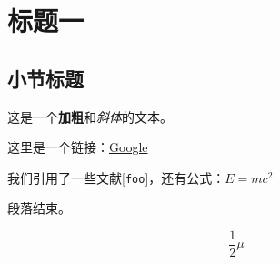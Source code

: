 \chapter{标题一}
\section{小节标题}
这是一个\textbf{加粗}和\textit{斜体}的文本。

这里是一个链接：\href{https://www.google.com}{Google}

我们引用了一些文献[\texttt{foo}]，还有公式：$E = mc^2$

段落结束。

\begin{equation}
\frac{1}{2}\mu
\label{eq:hhhhh}
\end{equation}


